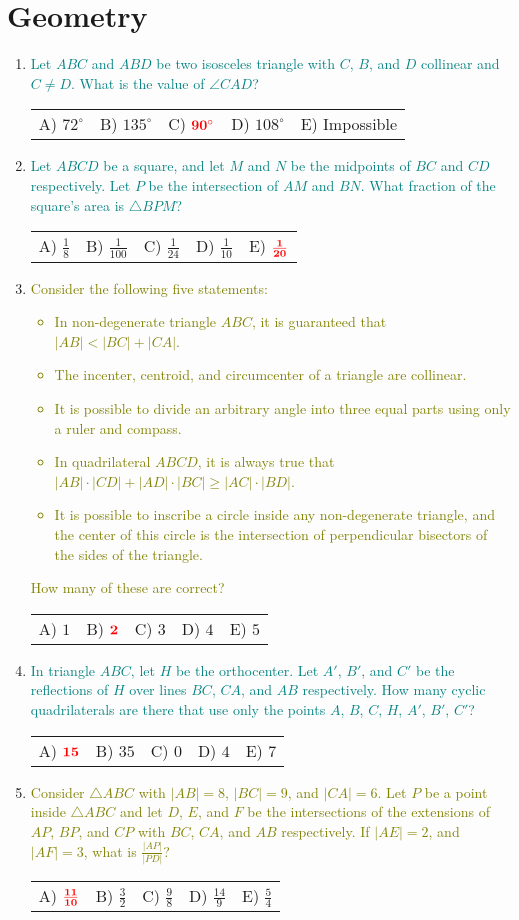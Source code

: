 \documentclass{article}
\newcommand{\answers}[5]{
    \newline
    {
        \centering
        \begin{tabular}{*{5}{p{0.15\textwidth}}}
            A) #1 & B) #2 & C) #3 & D) #4 & E) #5
        \end{tabular}
    }
}
\newcommand{\correct}[1]{
    \mathbf{\textcolor{red}{#1}}
}
\newcommand{\mustintermediate}[1]{
    \textcolor{teal}{#1}
}
\newcommand{\canadvanced}[1]{
    \textcolor{olive}{#1}
}
\begin{document}
\section{Geometry}
\begin{enumerate}[1.]

\item %
\mustintermediate{Let $ABC$ and $ABD$ be two isosceles triangle with $C$, $B$, and $D$ collinear and $C \ne D$.
What is the value of $\angle CAD$?}
\answers{$72^\circ$}{$135^\circ$}{$\correct{90^\circ}$}{$108^\circ$}{Impossible}


\item %
\mustintermediate{Let $ABCD$ be a square, and let $M$ and $N$ be the midpoints of $BC$ and $CD$ respectively.
Let $P$ be the intersection of $AM$ and $BN$.
What fraction of the square's area is $\triangle BPM$?}
\answers{ $\frac{1}{8}$ }{ $\frac{1}{100}$ }{ $\frac{1}{24}$ }{ $\frac{1}{10}$ }{ $\correct{\frac{1}{20}}$ }


\item %
\canadvanced{Consider the following five statements:
\begin{itemize}
    \item In non-degenerate triangle $ABC$, it is guaranteed that $|AB| < |BC| + |CA|$.
    \item The incenter, centroid, and circumcenter of a triangle are collinear.
    \item It is possible to divide an arbitrary angle into three equal parts using only a ruler and compass.
    \item In quadrilateral $ABCD$, it is always true that $|AB| \cdot |CD| + |AD| \cdot |BC| \ge |AC| \cdot |BD|$.
    \item It is possible to inscribe a circle inside any non-degenerate triangle, and the center of this circle is the intersection of perpendicular bisectors of the sides of the triangle.
\end{itemize}
How many of these are correct?}
\answers{$1$}{$\correct{2}$}{$3$}{$4$}{$5$}

\item %
\mustintermediate{In triangle $ABC$, let $H$ be the orthocenter.
Let $A'$, $B'$, and $C'$ be the reflections of $H$ over lines $BC$, $CA$, and $AB$ respectively.
How many cyclic quadrilaterals are there that use only the points $A$, $B$, $C$, $H$, $A'$, $B'$, $C'$?}
\answers{$\correct{15}$}{$35$}{$0$}{$4$}{$7$}


\item %
\canadvanced{Consider $\triangle ABC$ with $|AB| = 8$, $|BC| = 9$, and $|CA| = 6$.
Let $P$ be a point inside $\triangle ABC$ and let $D$, $E$, and $F$ be the intersections of the extensions of $AP$, $BP$, and $CP$ with $BC$, $CA$, and $AB$ respectively.
If $|AE| = 2$, and $|AF| = 3$, what is $\frac{|AP|}{|PD|}$?}
\answers{ $\correct{\frac{11}{10}}$ }{ $\frac{3}{2}$ }{ $\frac{9}{8}$ }{ $\frac{14}{9}$ }{ $\frac{5}{4}$ }

\end{enumerate}
\end{document}
